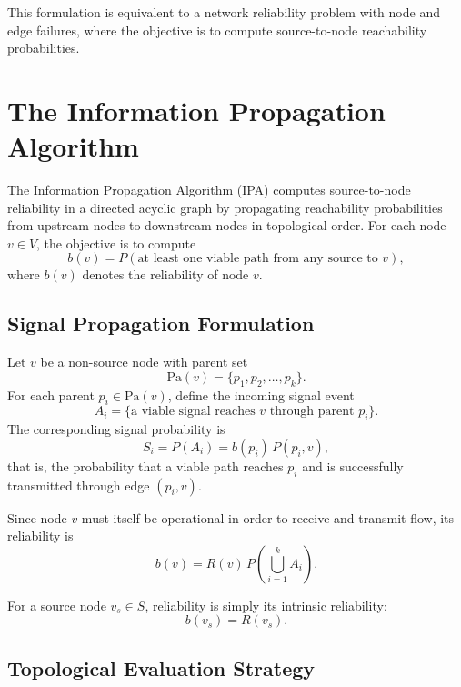 \documentclass[preprint,12pt]{elsarticle}
\begin{document}
This formulation is equivalent to a network reliability problem with node and edge failures, where the objective is to compute source-to-node reachability probabilities.

\section{The Information Propagation Algorithm}\label{sec:IPA}

The Information Propagation Algorithm (IPA) computes source-to-node reliability in a directed acyclic graph by propagating reachability probabilities from upstream nodes to downstream nodes in topological order. For each node $v \in V$, the objective is to compute
\begin{equation}
b(v) = P(\text{at least one viable path from any source to } v),
\end{equation}
where $b(v)$ denotes the reliability of node $v$.

\subsection{Signal Propagation Formulation}

Let $v$ be a non-source node with parent set
\[
\text{Pa}(v) = \{p_1, p_2, \ldots, p_k\}.
\]
For each parent $p_i \in \text{Pa}(v)$, define the incoming signal event
\[
A_i = \{\text{a viable signal reaches } v \text{ through parent } p_i\}.
\]
The corresponding signal probability is
\begin{equation}
S_i = P(A_i) = b(p_i)\,P(p_i,v),
\end{equation}
that is, the probability that a viable path reaches $p_i$ and is successfully transmitted through edge $(p_i,v)$.

Since node $v$ must itself be operational in order to receive and transmit flow, its reliability is
\begin{equation}
b(v) = R(v)\,P\left(\bigcup_{i=1}^{k} A_i\right).
\label{eq:general_belief_update}
\end{equation}

For a source node $v_s \in S$, reliability is simply its intrinsic reliability:
\begin{equation}
b(v_s) = R(v_s).
\label{eq:source_update}
\end{equation}

\subsection{Topological Evaluation Strategy}
\end{document}
